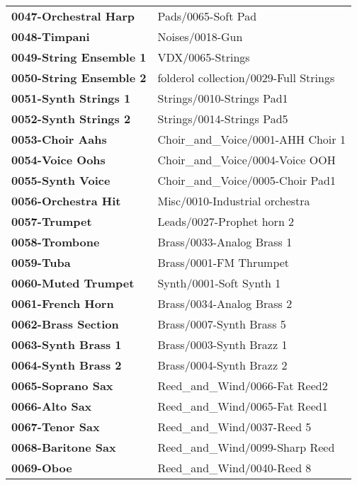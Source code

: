 \begin{longtable}{|l l|}
      \textbf{0047-Orchestral Harp} &
         Pads/0065-Soft Pad \\
      \textbf{0048-Timpani} &
         Noises/0018-Gun \\
      \textbf{0049-String Ensemble 1} &
         VDX/0065-Strings \\
      \textbf{0050-String Ensemble 2} &
         folderol collection/0029-Full Strings \\
      \textbf{0051-Synth Strings 1} &
         Strings/0010-Strings Pad1 \\
      \textbf{0052-Synth Strings 2} &
         Strings/0014-Strings Pad5 \\
      \textbf{0053-Choir Aahs} &
         Choir\_and\_Voice/0001-AHH Choir 1 \\
      \textbf{0054-Voice Oohs} &
         Choir\_and\_Voice/0004-Voice OOH \\
      \textbf{0055-Synth Voice} &
         Choir\_and\_Voice/0005-Choir Pad1 \\
      \textbf{0056-Orchestra Hit} &
         Misc/0010-Industrial orchestra \\
      \textbf{0057-Trumpet} &
         Leads/0027-Prophet horn 2 \\
      \textbf{0058-Trombone} &
         Brass/0033-Analog Brass 1 \\
      \textbf{0059-Tuba} &
         Brass/0001-FM Thrumpet \\
      \textbf{0060-Muted Trumpet} &
         Synth/0001-Soft Synth 1 \\
      \textbf{0061-French Horn} &
         Brass/0034-Analog Brass 2 \\
      \textbf{0062-Brass Section} &
         Brass/0007-Synth Brass 5 \\
      \textbf{0063-Synth Brass 1} &
         Brass/0003-Synth Brazz 1 \\
      \textbf{0064-Synth Brass 2} &
         Brass/0004-Synth Brazz 2 \\
      \textbf{0065-Soprano Sax} &
         Reed\_and\_Wind/0066-Fat Reed2 \\
      \textbf{0066-Alto Sax} &
         Reed\_and\_Wind/0065-Fat Reed1 \\
      \textbf{0067-Tenor Sax} &
         Reed\_and\_Wind/0037-Reed 5 \\
      \textbf{0068-Baritone Sax} &
         Reed\_and\_Wind/0099-Sharp Reed \\
      \textbf{0069-Oboe} &
         Reed\_and\_Wind/0040-Reed 8 \\

\end{longtable}
